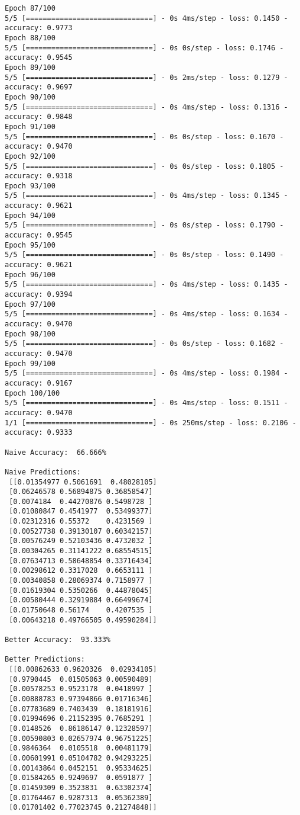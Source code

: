 \documentclass[12pt]{article}
\begin{document}
\begin{lstlisting}
Epoch 87/100
5/5 [==============================] - 0s 4ms/step - loss: 0.1450 - accuracy: 0.9773
Epoch 88/100
5/5 [==============================] - 0s 0s/step - loss: 0.1746 - accuracy: 0.9545
Epoch 89/100
5/5 [==============================] - 0s 2ms/step - loss: 0.1279 - accuracy: 0.9697
Epoch 90/100
5/5 [==============================] - 0s 4ms/step - loss: 0.1316 - accuracy: 0.9848
Epoch 91/100
5/5 [==============================] - 0s 0s/step - loss: 0.1670 - accuracy: 0.9470
Epoch 92/100
5/5 [==============================] - 0s 0s/step - loss: 0.1805 - accuracy: 0.9318
Epoch 93/100
5/5 [==============================] - 0s 4ms/step - loss: 0.1345 - accuracy: 0.9621
Epoch 94/100
5/5 [==============================] - 0s 0s/step - loss: 0.1790 - accuracy: 0.9545
Epoch 95/100
5/5 [==============================] - 0s 0s/step - loss: 0.1490 - accuracy: 0.9621
Epoch 96/100
5/5 [==============================] - 0s 4ms/step - loss: 0.1435 - accuracy: 0.9394
Epoch 97/100
5/5 [==============================] - 0s 4ms/step - loss: 0.1634 - accuracy: 0.9470
Epoch 98/100
5/5 [==============================] - 0s 0s/step - loss: 0.1682 - accuracy: 0.9470
Epoch 99/100
5/5 [==============================] - 0s 4ms/step - loss: 0.1984 - accuracy: 0.9167
Epoch 100/100
5/5 [==============================] - 0s 4ms/step - loss: 0.1511 - accuracy: 0.9470
1/1 [==============================] - 0s 250ms/step - loss: 0.2106 - accuracy: 0.9333

Naive Accuracy:  66.666%

Naive Predictions:
 [[0.01354977 0.5061691  0.48028105]
 [0.06246578 0.56894875 0.36858547]
 [0.0074184  0.44270876 0.5498728 ]
 [0.01080847 0.4541977  0.53499377]
 [0.02312316 0.55372    0.4231569 ]
 [0.00527738 0.39130107 0.60342157]
 [0.00576249 0.52103436 0.4732032 ]
 [0.00304265 0.31141222 0.68554515]
 [0.07634713 0.58648854 0.33716434]
 [0.00298612 0.3317028  0.6653111 ]
 [0.00340858 0.28069374 0.7158977 ]
 [0.01619304 0.5350266  0.44878045]
 [0.00580444 0.32919884 0.66499674]
 [0.01750648 0.56174    0.4207535 ]
 [0.00643218 0.49766505 0.49590284]]

Better Accuracy:  93.333%

Better Predictions:
 [[0.00862633 0.9620326  0.02934105]
 [0.9790445  0.01505063 0.00590489]
 [0.00578253 0.9523178  0.0418997 ]
 [0.00888783 0.97394866 0.01716346]
 [0.07783689 0.7403439  0.18181916]
 [0.01994696 0.21152395 0.7685291 ]
 [0.0148526  0.86186147 0.12328597]
 [0.00590803 0.02657974 0.96751225]
 [0.9846364  0.0105518  0.00481179]
 [0.00601991 0.05104782 0.94293225]
 [0.00143864 0.0452151  0.95334625]
 [0.01584265 0.9249697  0.0591877 ]
 [0.01459309 0.3523831  0.63302374]
 [0.01764467 0.9287313  0.05362389]
 [0.01701402 0.77023745 0.21274848]]

\end{lstlisting}
\end{document}
